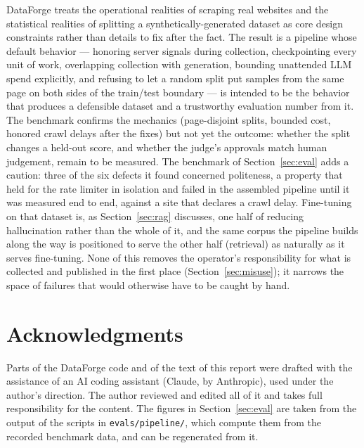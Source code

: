 \documentclass[11pt]{article}
\begin{document}
DataForge treats the operational realities of scraping real websites and
the statistical realities of splitting a synthetically-generated dataset
as core design constraints rather than details to fix after the fact.
The result is a pipeline whose default behavior --- honoring server
signals during collection, checkpointing every unit of work, overlapping
collection with generation, bounding unattended LLM spend explicitly,
and refusing to let a random split put samples from the same page on
both sides of the train/test boundary --- is intended to be the behavior
that produces a defensible dataset and a trustworthy evaluation number
from it. The benchmark confirms the mechanics (page-disjoint splits,
bounded cost, honored crawl delays after the fixes) but not yet the
outcome: whether the split changes a held-out score, and whether the
judge's approvals match human judgement, remain to be measured. The benchmark of
Section~\ref{sec:eval} adds a caution: three of the six defects it found
concerned politeness, a property that held for the rate limiter in
isolation and failed in the assembled pipeline until it was measured end
to end, against a site that declares a crawl delay. Fine-tuning on that dataset is,
as Section~\ref{sec:rag} discusses, one half of reducing hallucination
rather than the whole of it, and the same corpus the pipeline builds
along the way is positioned to serve the other half (retrieval) as
naturally as it serves fine-tuning. None of this removes the operator's
responsibility for what is collected and published in the first place
(Section~\ref{sec:misuse}); it narrows the space of failures that would
otherwise have to be caught by hand.

\section*{Acknowledgments}
Parts of the DataForge code and of the text of this report were drafted
with the assistance of an AI coding assistant (Claude, by Anthropic), used
under the author's direction. The author reviewed and edited all of it and
takes full responsibility for the content. The figures in
Section~\ref{sec:eval} are taken from the output of the scripts in
\texttt{evals/pipeline/}, which compute them from the recorded benchmark
data, and can be regenerated from it.
\end{document}
